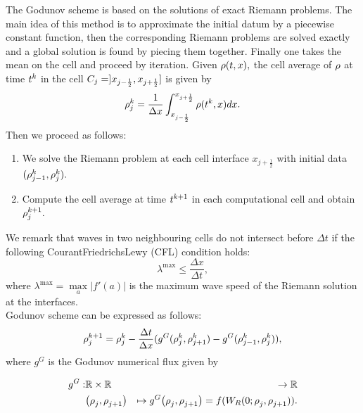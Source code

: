 		The Godunov scheme is based on the solutions of exact Riemann problems. The main idea of this method is to approximate the initial datum by a piecewise constant function, then the corresponding Riemann problems are solved exactly and a global solution is found by piecing them together. Finally one takes the mean on the cell and proceed by iteration. Given $\rho(t,x),$ the cell average of $\rho$ at time $t^{k}$ in the cell $C_{j}=]x_{j-\frac{1}{2}},x_{j+\frac{1}{2}}]$ is given by 
		\begin{equation}
			\rho_{j}^{k}=\dfrac{1}{\Delta x}\int_{x_{j-\frac{1}{2}}}^{x_{j+\frac{1}{2}}}\rho(t^{k},x)dx.\label{eq:godproj}
		\end{equation}
		Then we proceed as follows:
		\begin{enumerate}
			\item We solve the Riemann problem at each cell interface $x_{j+\frac{1}{2}}$ with initial data $(\rho^{k}_{j-1},\rho^{k}_{j}).$
			\item Compute the cell average at time $t^{k +1}$ in each computational cell and obtain $\rho^{k +1}_{j}.$ 
		\end{enumerate}
		
		We remark that waves in two neighbouring cells do not intersect before $\Delta t$ if the following Courant\textendash{}Friedrichs\textendash{}Lewy (CFL) condition holds:
		\begin{equation}\label{eq:CFL}
			\lambda^{\max}\le\frac{\Delta x}{\Delta t},
		\end{equation}
		where $\lambda^{\max}=\underset{a}{\max}|f'\left(a\right)|$ is the maximum wave speed of the Riemann solution at the interfaces.\\
		Godunov scheme can be expressed as follows:
		\begin{equation}
			\rho_{j}^{k+1}=\rho_{j}^{k}-\frac{\Delta t}{\Delta x}(g^{G}(\rho_{j}^{k},\rho_{j+1}^{k})-g^{G}(\rho_{j-1}^{k},\rho_{j}^{k})),\label{eq:godscheme}
		\end{equation}
		where $g^{G}$ is the Godunov numerical flux given by
		
		\begin{eqnarray*}
			\god: & \mathbb{R}\times\mathbb{R} & \rightarrow\mathbb{R}\\
			& \left(\discrete{\xind}{},\discrete{\xind+1}{}\right) & \mapsto\god\left(\discrete{\xind}{},\discrete{\xind+1}{}\right)=f(W_{R}(0;\discrete{\xind}{},\discrete{\xind+1}{})).
		\end{eqnarray*}
		
